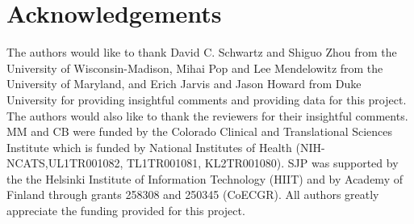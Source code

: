 \section{Acknowledgements}
The authors would like to thank David C. Schwartz and Shiguo Zhou from the University of Wisconsin-Madison, Mihai Pop and Lee Mendelowitz from the University of Maryland, and Erich Jarvis and Jason Howard from Duke University for providing insightful comments and providing data for this project.  The authors would also like to thank the reviewers for their insightful comments.
MM and CB were funded by the Colorado Clinical and Translational Sciences Institute which is funded by National Institutes of Health (NIH-NCATS,UL1TR001082, TL1TR001081, KL2TR001080).  SJP was supported by the 
the Helsinki Institute of Information Technology (HIIT) and by Academy of Finland through grants 258308 and 250345 (CoECGR).  All authors greatly appreciate the funding provided for this project.  
